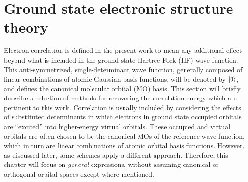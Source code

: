 \section{Ground state electronic structure theory} \label{se:est}
Electron correlation is defined in the present work to mean any additional effect beyond what is
included in the ground state Hartree-Fock (HF) wave function. This anti-symmetrized, 
single-determinant wave function, generally composed of linear combinations of atomic Gaussian basis functions, will be denoted by $| 0 \rangle$, and defines the canonical molecular orbital (MO) basis. 
This section will briefly describe a selection of methods for recovering the correlation energy which are
pertinent to this work.
Correlation is usually included by considering the effects of substituted determinants in which electrons
in ground state occupied orbitals are ``excited'' into higher-energy virtual orbitals. These 
occupied and virtual orbitals are often chosen to be the canonical MOs of the reference 
wave function, which in turn are linear combinations of atomic orbital basis functions.
However, as discussed later, some schemes apply a different approach. Therefore, this 
chapter will focus on \textit{general} expressions, without assuming canonical or orthogonal orbital
spaces except where mentioned.   

